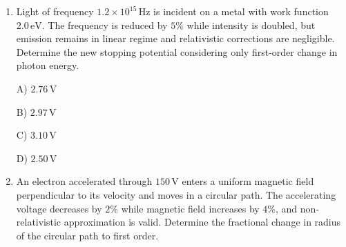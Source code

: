 \documentclass[12pt]{article}
\begin{document}
\begin{enumerate}[leftmargin=*]
\begin{center}
\end{center}

A) \(1.05\,\text{cm}\)  

B) \(1.00\,\text{cm}\)  

C) \(0.95\,\text{cm}\)  

D) \(1.10\,\text{cm}\)  


\item Light of frequency \(1.2\times10^{15}\,\text{Hz}\) is incident on a metal with work function \(2.0\,\text{eV}\). The frequency is reduced by \(5\%\) while intensity is doubled, but emission remains in linear regime and relativistic corrections are negligible. Determine the new stopping potential considering only first-order change in photon energy.  

A) \(2.76\,\text{V}\)  

B) \(2.97\,\text{V}\)  

C) \(3.10\,\text{V}\)  

D) \(2.50\,\text{V}\)  


\item An electron accelerated through \(150\,\text{V}\) enters a uniform magnetic field perpendicular to its velocity and moves in a circular path. The accelerating voltage decreases by \(2\%\) while magnetic field increases by \(4\%\), and non-relativistic approximation is valid. Determine the fractional change in radius of the circular path to first order.  

\begin{center}
\end{center}


\end{enumerate}
\end{document}
